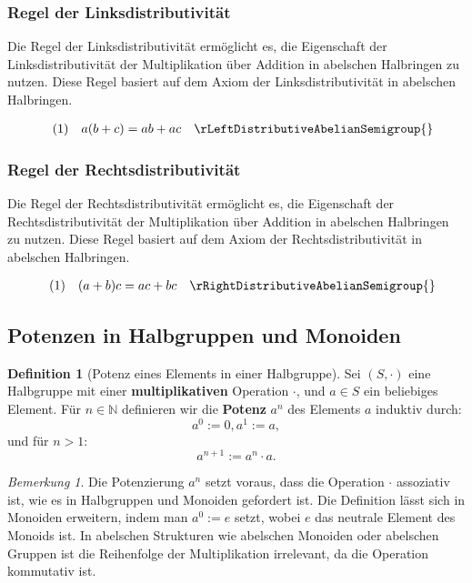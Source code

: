 \documentclass{book}
\theoremstyle{plain}
\theoremstyle{remark}
\newtheorem*{remark}{Bemerkung}
\theoremstyle{definition}
\newtheorem{definition}{Definition}[section]
\begin{document}
\subsubsection*{Regel der Linksdistributivität}
\label{rule:rLeftDistributiveAbelianSemigroup}
Die Regel der Linksdistributivität ermöglicht es, die Eigenschaft der Linksdistributivität der Multiplikation über Addition in abelschen Halbringen zu nutzen. Diese Regel basiert auf dem Axiom der Linksdistributivität in abelschen Halbringen.

\[
\begin{array}{llll}
      & (1) & a(b + c) = ab+ac & \rLeftDistributiveAbelianSemigroup{}
\end{array}
\]
\subsubsection*{Regel der Rechtsdistributivität}
\label{rule:rRightDistributiveAbelianSemigroup}
Die Regel der Rechtsdistributivität ermöglicht es, die Eigenschaft der Rechtsdistributivität der Multiplikation über Addition in abelschen Halbringen zu nutzen. Diese Regel basiert auf dem Axiom der Rechtsdistributivität in abelschen Halbringen.

\[
\begin{array}{llll}
       & (1) & (a + b)c = ac+bc & \rRightDistributiveAbelianSemigroup{}
\end{array}
\]



\subsection{Potenzen in Halbgruppen und Monoiden}

\begin{definition}[Potenz eines Elements in einer Halbgruppe]
    Sei \((S, \cdot)\) eine Halbgruppe mit einer \textbf{multiplikativen} Operation \(\cdot\), und \(a \in S\) ein beliebiges Element. Für \(n \in \mathbb{N}\) definieren wir die \textbf{Potenz} \(a^n\) des Elements \(a\) induktiv durch:
    \[
    a^0 := 0,
    a^1 := a,
    \]
    und für \(n > 1\):
    \[
    a^{n+1} := a^n \cdot a.
    \]
\end{definition}

\begin{remark}
    Die Potenzierung \(a^n\) setzt voraus, dass die Operation \(\cdot\) assoziativ ist, wie es in Halbgruppen und Monoiden gefordert ist. Die Definition lässt sich in Monoiden erweitern, indem man \(a^0 := e\) setzt, wobei \(e\) das neutrale Element des Monoids ist. In abelschen Strukturen wie abelschen Monoiden oder abelschen Gruppen ist die Reihenfolge der Multiplikation irrelevant, da die Operation kommutativ ist.
\end{remark}
\end{document}
